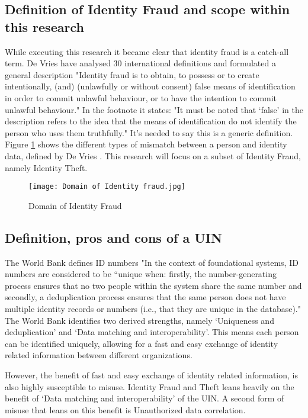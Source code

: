 \subsection{Definition of Identity Fraud and scope within this research}
While executing this research it became clear that identity fraud is a catch-all term. De Vries \etal \cite{97408536fd1c4f4e9d1615b7a4a4473e} have analysed 30 international definitions and formulated a general description "Identity fraud is to obtain, to possess or to create intentionally, (and) (unlawfully or without consent) false means of identification
in order to commit unlawful behaviour, or to have the intention to commit unlawful behaviour." In the footnote it states: "It must be noted that ‘false’ in the description refers to the idea that the means of identification do not identify the person who uses them truthfully." It's needed to say this is a generic definition. Figure \ref{fig:ID_fraud} shows the different types of mismatch between a person and identity data, defined by De Vries \etal \cite{Vries2007IdentiteitsfraudeEA}. This research will focus on a subset of Identity Fraud, namely Identity Theft.
\graphicspath{ {./images/} }
\begin{figure}[t]
\texttt{[image: Domain of Identity fraud.jpg]}\\
\caption{Domain of Identity Fraud}
\label{fig:ID_fraud}
\end{figure}

\subsection{Definition, pros and cons of a UIN}
The World Bank \cite{WorldBank_UIN} defines ID numbers "In the context of foundational systems, ID numbers are considered to be “unique when: firstly, the number-generating process ensures that no two people within the system share the same number and secondly, a deduplication process ensures that the same person does not have multiple identity records or numbers (i.e., that they are unique in the database)." The World Bank identifies two derived strengths, namely ‘Uniqueness and deduplication’ and ‘Data matching and interoperability’. This means each person can be identified uniquely, allowing for a fast and easy exchange of identity related information between different organizations.\par 
However, the benefit of fast and easy exchange of identity related information, is also highly susceptible to misuse. Identity Fraud and Theft leans heavily on the benefit of ‘Data matching and interoperability’ of the UIN. A second form of misuse that leans on this benefit is Unauthorized data correlation. \par

